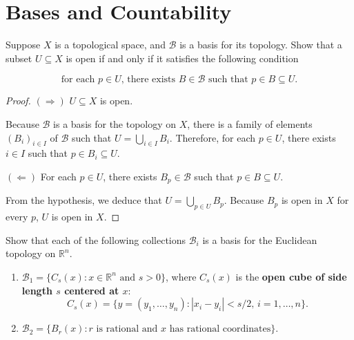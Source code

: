 \section*{Bases and Countability}

\begin{exercise}{2.40}
	Suppose $X$ is a topological space, and $\mathscr{B}$ is a basis for its topology. Show that a subset $U\subseteq X$ is open if and only if it satisfies the following condition

	\begin{equation*}
		\text{for each $p\in U$, there exists $B\in\mathscr{B}$ such that $p\in B\subseteq U$.}
	\end{equation*}
\end{exercise}

\begin{proof}
	$(\Longrightarrow)$ $U\subseteq X$ is open.

	Because $\mathscr{B}$ is a basis for the topology on $X$, there is a family of elements ${(B_{i})}_{i\in I}$ of $\mathscr{B}$ such that $U = \bigcup_{i\in I} B_{i}$. Therefore, for each $p\in U$, there exists $i\in I$ such that $p\in B_{i}\subseteq U$.

	$(\Longleftarrow)$ For each $p\in U$, there exists $B_{p}\in\mathscr{B}$ such that $p\in B\subseteq U$.

	From the hypothesis, we deduce that $U = \bigcup_{p\in U}B_{p}$. Because $B_{p}$ is open in $X$ for every $p$, $U$ is open in $X$.
\end{proof}

\begin{exercise}{2.42}
	Show that each of the following collections $\mathscr{B}_{i}$ is a basis for the Euclidean topology on $\mathbb{R}^{n}$.
	\begin{enumerate}[label={(\alph*)}]
		\item $\mathscr{B}_{1} = \{ C_{s}(x): x\in\mathbb{R}^{n} \text{ and } s > 0 \}$, where $C_{s}(x)$ is the \textbf{open cube of side length $s$ centered at $x$}:
		      \[
			      C_{s}(x) = \{ y = (y_{1}, \ldots, y_{n}) : \left\vert{x_{i} - y_{i}}\right\vert < s/2,\, i = 1,\ldots,n \}.
		      \]
		\item $\mathscr{B}_{2} = \{ B_{r}(x): \text{$r$ is rational and $x$ has rational coordinates} \}$.
	\end{enumerate}
\end{exercise}

